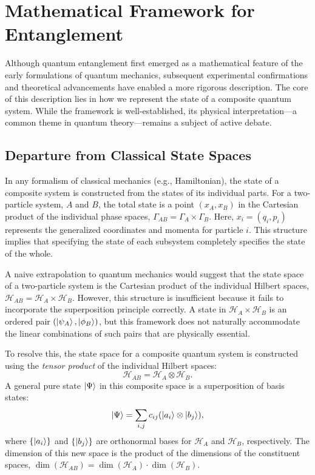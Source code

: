 \section{Mathematical Framework for Entanglement}
\label{sec:math_framework}

Although quantum entanglement first emerged as a mathematical feature of the
early formulations of quantum mechanics, subsequent experimental confirmations
and theoretical advancements have enabled a more rigorous description.
The core of this description lies in how we represent the state of a
composite quantum system. While the framework is well-established, its
physical interpretation---a common theme in quantum theory---remains a
subject of active debate.

\subsection{Departure from Classical State Spaces}
\label{sub:departure_classical}

In any formalism of classical mechanics (e.g., Hamiltonian), the state of a
composite system is constructed from the states of its individual parts.
For a two-particle system, $A$ and $B$, the total state is a point
$(x_A, x_B)$ in the Cartesian product of the individual
phase spaces, $\Gamma_{AB} = \Gamma_A \times \Gamma_B$.
Here, $x_i = (q_i, p_i)$ represents the generalized coordinates and
momenta for particle $i$. This structure implies that specifying the state of
each subsystem completely specifies the state of the whole.

A naive extrapolation to quantum mechanics would suggest that the state space
of a two-particle system is the Cartesian product of the individual Hilbert
spaces, $\mathcal{H}_{AB} = \mathcal{H}_A \times \mathcal{H}_B$. However, this
structure is insufficient because it fails to incorporate the
superposition principle correctly. A state in
$\mathcal{H}_A \times \mathcal{H}_B$ is an ordered pair $(\ket{\psi_A},
\ket{\phi_B})$, but this framework does not naturally accommodate the
linear combinations of such pairs that are physically essential.

To resolve this, the state space for a composite quantum system is
constructed using the \emph{tensor product} of the individual Hilbert
spaces:
\begin{equation}
	\mathcal{H}_{AB} = \mathcal{H}_A \otimes \mathcal{H}_B.
\end{equation}
A general pure state $\ket{\Psi}$ in this composite space is a superposition
of basis states:
\begin{equation}
	\ket{\Psi} = \sum_{i,j} c_{ij} (\ket{a_i} \otimes \ket{b_j}),
	\label{eq:general_state}
\end{equation}
where $\{\ket{a_i}\}$ and $\{\ket{b_j}\}$ are orthonormal bases for
$\mathcal{H}_A$ and $\mathcal{H}_B$, respectively. The dimension of this new
space is the product of the dimensions of the constituent spaces,
$\dim(\mathcal{H}_{AB}) = \dim(\mathcal{H}_A) \cdot \dim(\mathcal{H}_B)$.

